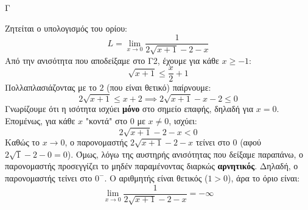 \begin{thema}{Γ}
\begin{erwthma}
\item Ζητείται ο υπολογισμός του ορίου:
\[ L = \lim_{x \to 0} \frac{1}{2\sqrt{x+1} - 2 - x} \]
Από την ανισότητα που αποδείξαμε στο Γ2, έχουμε για κάθε $x \ge -1$:
\[ \sqrt{x+1} \le \frac{x}{2} + 1 \]
Πολλαπλασιάζοντας με το $2$ (που είναι θετικό) παίρνουμε:
\[ 2\sqrt{x+1} \le x + 2 \implies 2\sqrt{x+1} - x - 2 \le 0 \]
Γνωρίζουμε ότι η ισότητα ισχύει \textbf{μόνο} στο σημείο επαφής, δηλαδή για $x = 0$.
Επομένως, για κάθε $x$ "κοντά" στο $0$ με $x \neq 0$, ισχύει:
\[ 2\sqrt{x+1} - 2 - x < 0 \]
Καθώς το $x \to 0$, ο παρονομαστής $2\sqrt{x+1} - 2 - x$ τείνει στο $0$ (αφού $2\sqrt{1} - 2 - 0 = 0$). 
Όμως, λόγω της αυστηρής ανισότητας που δείξαμε παραπάνω, ο παρονομαστής προσεγγίζει το μηδέν παραμένοντας διαρκώς \textbf{αρνητικός}. 
Δηλαδή, ο παρονομαστής τείνει στο $0^-$.
Ο αριθμητής είναι θετικός ($1 > 0$), άρα το όριο είναι:
\[ \lim_{x \to 0} \frac{1}{2\sqrt{x+1} - 2 - x} = -\infty \]
\end{erwthma}
\end{thema}

